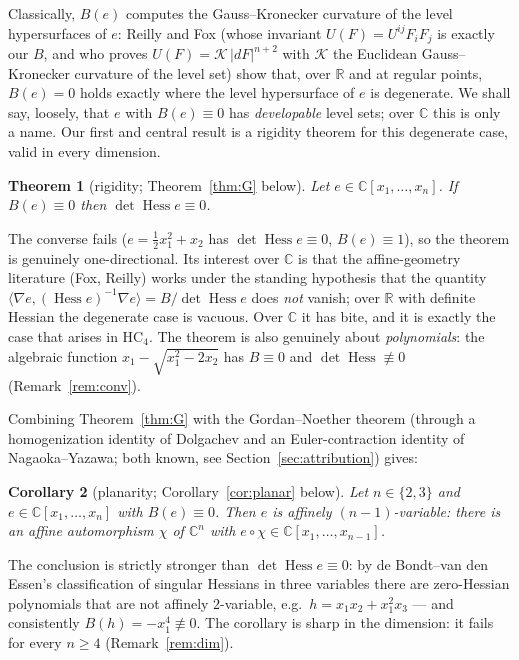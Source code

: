 \documentclass[11pt]{article}
\theoremstyle{plain}
\newtheorem{theorem}{Theorem}[section]
\newtheorem{corollary}[theorem]{Corollary}
\theoremstyle{definition}
\newcommand{\C}{\mathbb{C}}
\newcommand{\R}{\mathbb{R}}
\newcommand{\Hess}{\operatorname{Hess}}
\newcommand{\HC}{\mathrm{HC}}
\begin{document}
Classically, $B(e)$ computes the Gauss--Kronecker curvature of the level
hypersurfaces of $e$: Reilly \cite[Prop.~4]{Reilly} and Fox
\cite{Fox2017} (whose invariant $U(F)=U^{ij}F_iF_j$ is exactly our $B$,
and who proves $U(F)=\mathcal K\,|dF|^{n+2}$ with $\mathcal K$ the
Euclidean Gauss--Kronecker curvature of the level set) show that, over
$\R$ and at regular points, $B(e)=0$ holds exactly where the level
hypersurface of $e$ is degenerate. We shall say, loosely, that $e$ with
$B(e)\equiv0$ has \emph{developable} level sets; over $\C$ this is only a
name. Our first and central result is a rigidity theorem for this
degenerate case, valid in every dimension.

\begin{theorem}[rigidity; Theorem~\ref{thm:G} below]
Let $e\in\C[x_1,\dots,x_n]$. If $B(e)\equiv0$ then
$\det\Hess e\equiv0$.
\end{theorem}

The converse fails ($e=\tfrac12x_1^2+x_2$ has $\det\Hess e\equiv0$,
$B(e)\equiv1$), so the theorem is genuinely one-directional. Its interest
over $\C$ is that the affine-geometry literature (Fox, Reilly) works under
the standing hypothesis that the quantity
$\langle\nabla e,(\Hess e)^{-1}\nabla e\rangle=B/\det\Hess e$ does
\emph{not} vanish; over $\R$ with definite Hessian the degenerate case is
vacuous. Over $\C$ it has bite, and it is exactly the case that arises in
$\HC_4$. The theorem is also genuinely about \emph{polynomials}: the
algebraic function $x_1-\sqrt{x_1^2-2x_2}$ has $B\equiv0$ and
$\det\Hess\not\equiv0$ (Remark~\ref{rem:conv}).

Combining Theorem~\ref{thm:G} with the Gordan--Noether theorem (through a
homogenization identity of Dolgachev and an Euler-contraction identity of
Nagaoka--Yazawa; both known, see Section~\ref{sec:attribution}) gives:

\begin{corollary}[planarity; Corollary~\ref{cor:planar} below]
Let $n\in\{2,3\}$ and $e\in\C[x_1,\dots,x_n]$ with $B(e)\equiv0$. Then $e$
is affinely $(n-1)$-variable: there is an affine automorphism $\chi$ of
$\C^n$ with $e\circ\chi\in\C[x_1,\dots,x_{n-1}]$.
\end{corollary}

The conclusion is strictly stronger than $\det\Hess e\equiv0$: by de
Bondt--van den Essen's classification of singular Hessians in three
variables \cite{dBvdE} there are zero-Hessian polynomials that are not
affinely $2$-variable, e.g.\ $h=x_1x_2+x_1^2x_3$ --- and consistently
$B(h)=-x_1^4\not\equiv0$. The corollary is sharp in the dimension: it
fails for every $n\ge4$ (Remark~\ref{rem:dim}).
\end{document}
